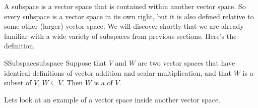 %
A subspace is a vector space that is contained within another vector space.  So every subspace is a vector space in its own right, but it is also defined relative to some other (larger) vector space.  We will discover shortly that we are already familiar with a wide variety of subspaces from previous sections.  Here's the definition.
%
\begin{definition}{S}{Subspace}{subspace}
Suppose that $V$ and $W$ are two vector spaces that have identical definitions of vector addition and scalar multiplication, and that $W$ is a subset of $V$, $W\subseteq V$.  Then $W$ is a  of $V$.
\end{definition}
%
Lets look at an example of a vector space inside another vector space.
%
%
